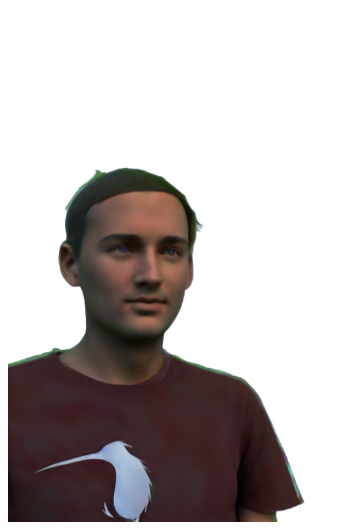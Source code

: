 \begin{figure}[ht]
\begin{subfigure}{0.08\linewidth}
        \includegraphics[width=\textwidth]{Figures/results/high/simon_3d/11_render.png}
	\end{subfigure}
    \begin{subfigure}{0.08\linewidth}%

\end{subfigure}
\end{figure}
